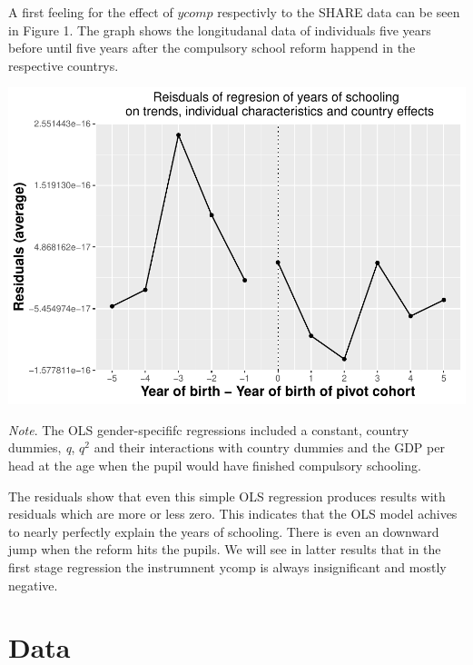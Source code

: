 \documentclass[12pt,a4paper]{article}
\let\origfigure\figure
\let\endorigfigure\endfigure
\renewenvironment{figure}[1][2] {
    \expandafter\origfigure\expandafter[H]
} {
    \endorigfigure
}
\begin{document}
A first feeling for the effect of \(ycomp\) respectivly to the SHARE
data can be seen in Figure 1. The graph shows the longitudanal data of
individuals five years before until five years after the compulsory
school reform happend in the respective countrys.

\begin{figure}
\centering
\includegraphics{term_paper_eem_files/figure-latex/unnamed-chunk-1-1.pdf}
\caption{\emph{The Effect of School Reforms on Educational Attainment}}
\end{figure}

\textit{Note}. The OLS gender-specififc regressions included a constant,
country dummies, \textit{q}, \textit{$q^2$} and their interactions with
country dummies and the GDP per head at the age when the pupil would
have finished compulsory schooling.

The residuals show that even this simple OLS regression produces results
with residuals which are more or less zero. This indicates that the OLS
model achives to nearly perfectly explain the years of schooling. There
is even an downward jump when the reform hits the pupils. We will see in
latter results that in the first stage regression the instrumnent ycomp
is always insignificant and mostly negative.

\section{Data}\label{data}
\end{document}
